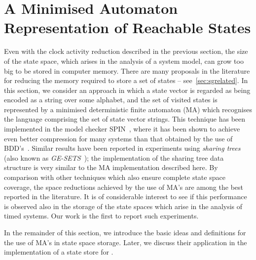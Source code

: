 \section{A Minimised Automaton Representation of Reachable States\label{sec:sgma}}
Even with the clock activity reduction described in the previous
section, the size of the state space, which arises in the analysis of
a system model, can grow too big to be stored in computer
memory. There are many proposals in the literature for reducing the
memory required to store a set of states --
see~\Sec\ref{sec:sgrelated}. In this section, we consider an approach
in which a state vector is regarded as being encoded as a string over
some alphabet, and the set of visited states is represented by a
minimised deterministic finite automaton (MA) which recognises the
language comprising the set of state vector strings.  This technique
has been implemented in the model checker SPIN~\cite{hp:99}, where it
has been shown to achieve even better compression for many systems
than that obtained by the use of BDD's~\cite{vis:96}. Similar results
have been reported in experiments using \emph{sharing
trees}~\cite{ggz:95,zam:97} (also known as
\emph{GE-SETS}~\cite{gre:96}); the implementation of the sharing tree data
structure is very similar to the MA implementation described here.  By
comparison with other techniques which also ensure complete state space
coverage, the space reductions achieved by the use of MA's are among
the best reported in the literature. It is of considerable interest to
see if this performance is observed also in the storage of the state
spaces which arise in the analysis of timed systems. Our work is the
first to report such experiments.

In the remainder of this section, we introduce the basic ideas and definitions
for the use of MA's in state space storage. Later, we discuss
their application in the implementation of a state store for \bcandle.

